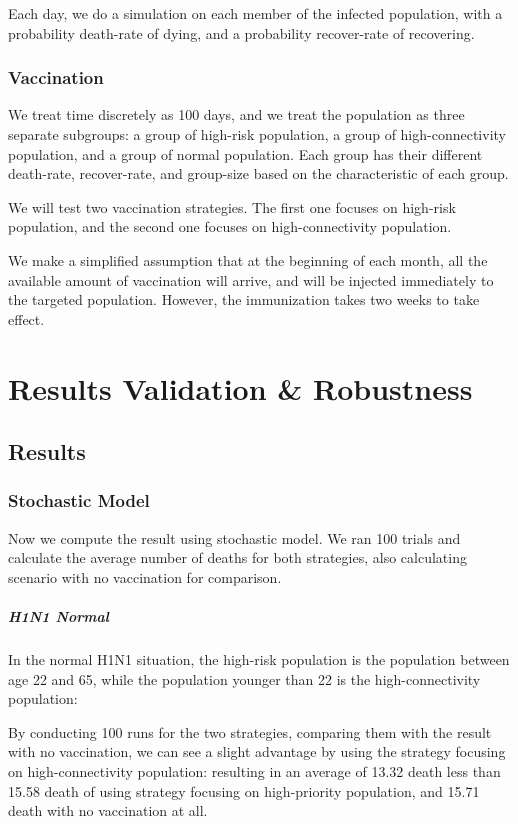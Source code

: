 \documentclass[titlepage]{article}
\begin{document}
Each day, we do a simulation on each member of the infected population, with a probability death-rate of dying, and a probability recover-rate of recovering.

\subsubsection{Vaccination}
We treat time discretely as 100 days, and we treat the population as three separate subgroups: a group of high-risk population, a group of high-connectivity population, and a group of normal population. Each group has their different death-rate, recover-rate, and group-size based on the characteristic of each group.

We will test two vaccination strategies. The first one focuses on high-risk population, and the second one focuses on high-connectivity population.

We make a simplified assumption that at the beginning of each month, all the available amount of vaccination will arrive, and will be injected immediately to the targeted population. However, the immunization takes two weeks to take effect.

\section{Results Validation \& Robustness}
\subsection{Results}
\subsubsection{Stochastic Model}
Now we compute the result using stochastic model. We ran 100 trials and calculate the average number of deaths for both strategies, also calculating scenario with no vaccination for comparison.
\subparagraph{H1N1 Normal}

In the normal H1N1 situation, the high-risk population is the population between age 22 and 65, while the population younger than 22 is the high-connectivity population:

By conducting 100 runs for the two strategies, comparing them with the result with no vaccination, we can see a slight advantage by using the strategy focusing on high-connectivity population: resulting in an average of 13.32 death less than 15.58 death of using strategy focusing on high-priority population, and 15.71 death with no vaccination at all.
\end{document}
